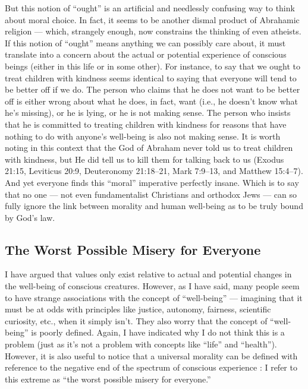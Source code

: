\documentclass[a4paper,14pt]{extarticle}
\begin{document}
But this notion of ``ought'' is an artificial and needlessly confusing way to think about moral choice.
In fact, it seems to be another dismal product of Abrahamic religion --- which, strangely enough, now constrains the thinking of even atheists.
If this notion of ``ought'' means anything we can possibly care about, it must translate into a concern about the actual or potential experience of conscious beings (either in this life or in some other).
For instance, to say that we ought to treat children with kindness seems identical to saying that everyone will tend to be better off if we do.
The person who claims that he does not want to be better off is either wrong about what he does, in fact, want (i.e., he doesn't know what he's missing), or he is lying, or he is not making sense.
The person who insists that he is committed to treating children with kindness for reasons that have nothing to do with anyone's well-being is also not making sense.
It is worth noting in this context that the God of Abraham never told us to treat children with kindness, but He did tell us to kill them for talking back to us (Exodus 21:15, Leviticus 20:9, Deuteronomy 21:18–21, Mark 7:9–13, and Matthew 15:4–7).
And yet everyone finds this ``moral'' imperative perfectly insane.
Which is to say that no one --- not even fundamentalist Christians and orthodox Jews --- can so fully ignore the link between morality and human well-being as to be truly bound by God's law.

\subsection{The Worst Possible Misery for Everyone}

I have argued that values only exist relative to actual and potential changes in the well-being of conscious creatures.
However, as I have said, many people seem to have strange associations with the concept of ``well-being'' --- imagining that it must be at odds with principles like justice, autonomy, fairness, scientific curiosity, etc., when it simply isn't.
They also worry that the concept of “well-being” is poorly defined.
Again, I have indicated why I do not think this is a problem (just as it's not a problem with concepts like ``life'' and ``health'').
However, it is also useful to notice that a universal morality can be defined with reference to the negative end of the spectrum of conscious experience : I
refer to this extreme as ``the worst possible misery for everyone.''
\end{document}
